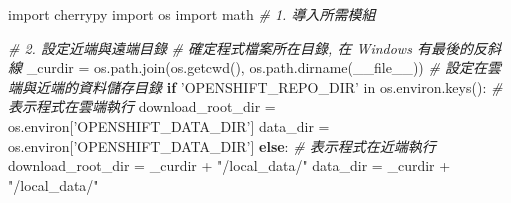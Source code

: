 \documentclass[]{article}
\newenvironment{Shaded}{}{}
\newcommand{\KeywordTok}[1]{\textcolor[rgb]{0.00,0.44,0.13}{\textbf{{#1}}}}
\newcommand{\CharTok}[1]{\textcolor[rgb]{0.25,0.44,0.63}{{#1}}}
\newcommand{\StringTok}[1]{\textcolor[rgb]{0.25,0.44,0.63}{{#1}}}
\newcommand{\CommentTok}[1]{\textcolor[rgb]{0.38,0.63,0.69}{\textit{{#1}}}}
\newcommand{\OtherTok}[1]{\textcolor[rgb]{0.00,0.44,0.13}{{#1}}}
\newcommand{\NormalTok}[1]{{#1}}
\begin{document}
\begin{Shaded}
\begin{Highlighting}[]
\CharTok{import} \NormalTok{cherrypy}
\CharTok{import} \NormalTok{os}
\CharTok{import} \NormalTok{math}
\CommentTok{# 1. 導入所需模組}

\CommentTok{# 2. 設定近端與遠端目錄}
\CommentTok{# 確定程式檔案所在目錄, 在 Windows 有最後的反斜線}
\NormalTok{_curdir = os.path.join(os.getcwd(), os.path.dirname(}\OtherTok{__file__}\NormalTok{))}
\CommentTok{# 設定在雲端與近端的資料儲存目錄}
\KeywordTok{if} \StringTok{'OPENSHIFT_REPO_DIR'} \NormalTok{in os.environ.keys():}
    \CommentTok{# 表示程式在雲端執行}
    \NormalTok{download_root_dir = os.environ[}\StringTok{'OPENSHIFT_DATA_DIR'}\NormalTok{]}
    \NormalTok{data_dir = os.environ[}\StringTok{'OPENSHIFT_DATA_DIR'}\NormalTok{]}
\KeywordTok{else}\NormalTok{:}
    \CommentTok{# 表示程式在近端執行}
    \NormalTok{download_root_dir = _curdir + }\StringTok{"/local_data/"}
    \NormalTok{data_dir = _curdir + }\StringTok{"/local_data/"}
 

\end{Highlighting}
\end{Shaded}
\end{document}
